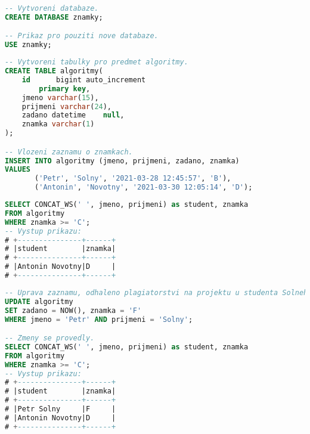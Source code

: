 \lstset{frame=single}
\begin{lstlisting}[language=SQL, basicstyle=\footnotesize\ttfamily, label={code:SQLdemo:create_db}, caption=Vytvoření databáze a provedení příkazu pro použití této nově vytvořené databáze.]
-- Vytvoreni databaze.
CREATE DATABASE znamky;

-- Prikaz pro pouziti nove databaze.
USE znamky;
\end{lstlisting}

\lstset{frame=single}
\begin{lstlisting}[language=SQL, basicstyle=\footnotesize\ttfamily, label={code:SQLdemo:create_table_insert_revords}, caption=Vytvoření tabulky pro zaznamenávání známek pro předmět Algoritmy a vložení záznamů do této tabulky.]
-- Vytvoreni tabulky pro predmet algoritmy.
CREATE TABLE algoritmy(
    id      bigint auto_increment
        primary key,
    jmeno varchar(15),
    prijmeni varchar(24),
    zadano datetime    null,
    znamka varchar(1)
);

-- Vlozeni zaznamu o znamkach.
INSERT INTO algoritmy (jmeno, prijmeni, zadano, znamka)
VALUES
       ('Petr', 'Solny', '2021-03-28 12:45:57', 'B'),
       ('Antonin', 'Novotny', '2021-03-30 12:05:14', 'D');
\end{lstlisting}

\lstset{frame=single}
\begin{lstlisting}[language=SQL, basicstyle=\footnotesize\ttfamily, label={code:SQLdemo:select}, caption=Dotaz nad tabulkou na studenty se známkou C a horší.]
SELECT CONCAT_WS(' ', jmeno, prijmeni) as student, znamka
FROM algoritmy
WHERE znamka >= 'C';
-- Vystup prikazu:
# +---------------+------+
# |student        |znamka|
# +---------------+------+
# |Antonin Novotny|D     |
# +---------------+------+
\end{lstlisting}

\lstset{frame=single}
\begin{lstlisting}[language=SQL, basicstyle=\footnotesize\ttfamily, label={code:SQLdemo:update}, caption=Upravení hodnoty atributu \texttt{znamka} u vybraného studenta. Ověření{,} že se právě provedené změny aplikovali.]
-- Uprava zaznamu, odhaleno plagiatorstvi na projektu u studenta Solneho.
UPDATE algoritmy
SET zadano = NOW(), znamka = 'F'
WHERE jmeno = 'Petr' AND prijmeni = 'Solny';

-- Zmeny se provedly.
SELECT CONCAT_WS(' ', jmeno, prijmeni) as student, znamka
FROM algoritmy
WHERE znamka >= 'C';
-- Vystup prikazu:
# +---------------+------+
# |student        |znamka|
# +---------------+------+
# |Petr Solny     |F     |
# |Antonin Novotny|D     |
# +---------------+------+
\end{lstlisting}


